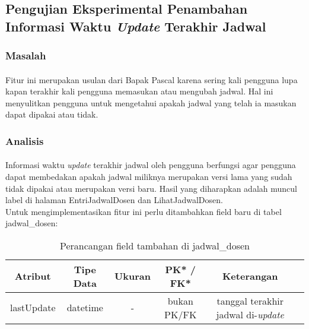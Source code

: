 \subsection{Pengujian Eksperimental Penambahan Informasi Waktu \textit{Update} Terakhir Jadwal}
\subsubsection{Masalah}
\paragraph{}Fitur ini merupakan usulan dari Bapak Pascal karena sering kali pengguna lupa kapan terakhir kali pengguna memasukan atau mengubah jadwal. Hal ini menyulitkan pengguna untuk mengetahui apakah jadwal yang telah ia masukan dapat dipakai atau tidak.
\subsubsection{Analisis}
\paragraph{}Informasi waktu \textit{update} terakhir jadwal oleh pengguna berfungsi agar pengguna dapat membedakan apakah jadwal miliknya merupakan versi lama yang sudah tidak dipakai atau merupakan versi baru. Hasil yang diharapkan adalah muncul label di halaman EntriJadwalDosen dan LihatJadwalDosen.\\
Untuk mengimplementasikan fitur ini perlu ditambahkan field baru di tabel jadwal\_dosen:
\begin{center}
\begin{table}[h]
\begin{tabular}{|c|c|c|c|c|c|}
 			\hline
		\textbf{Atribut} & \textbf{Tipe Data} & \textbf{Ukuran} & \textbf{PK* / FK*}  & \textbf{Keterangan} \\
			\hline
		 lastUpdate & datetime & - & bukan PK/FK &  tanggal terakhir jadwal di-\textit{update}\\
		 \hline
	\end{tabular}
	\caption{Perancangan field tambahan di jadwal\_dosen}
	\end{table}
\end{center}
